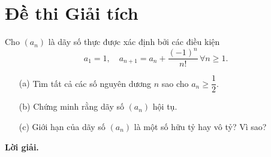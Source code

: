\newpage
\section{Đề thi Giải tích}

\begin{tcolorbox}[title=\textbf{Bài toán B.1 + A.1.},breakable]
    Cho $(a_n)$ là dãy số thực được xác định bởi các điều kiện $$a_1 = 1,\quad a_{n+1} = a_n + \dfrac{(-1)^n}{n!} \,\forall n \geq 1.$$
    \begin{enumerate}
        \item[(a)] {Tìm tất cả các số nguyên dương $n$ sao cho $a_n \geq \dfrac{1}{2}$.}
        \item[(b)] {Chứng minh rằng dãy số $(a_n)$ hội tụ.} 
        \item[(c)] Giới hạn của dãy số $(a_n)$ là một số hữu tỷ hay vô tỷ? Vì sao? 
    \end{enumerate}
\end{tcolorbox}

\textbf{Lời giải. }

